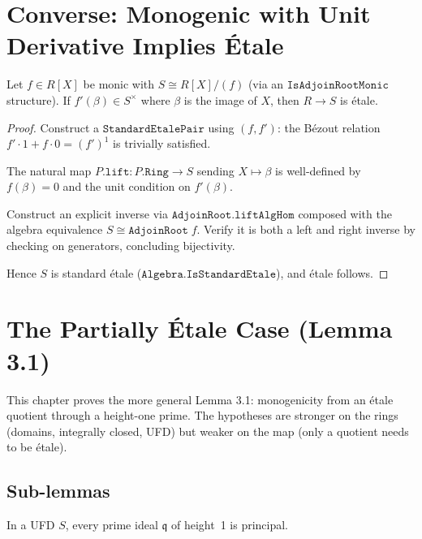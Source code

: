 \chapter{Converse: Monogenic with Unit Derivative Implies \'Etale}
\label{ch:converse}

\begin{theorem}
  \label{thm:algebra_etale}
  \leanok
  Let $f \in R[X]$ be monic with $S \cong R[X]/(f)$
  (via an $\mathtt{IsAdjoinRootMonic}$ structure).
  If $f'(\beta) \in S^\times$ where $\beta$ is the image of $X$,
  then $R \to S$ is étale.
\end{theorem}

\begin{proof}
  \leanok
  Construct a $\mathtt{StandardEtalePair}$ using $(f, f')$:
  the Bézout relation $f' \cdot 1 + f \cdot 0 = (f')^1$ is trivially satisfied.

  The natural map $P.\mathtt{lift} \colon P.\mathtt{Ring} \to S$ sending $X \mapsto \beta$
  is well-defined by $f(\beta) = 0$ and the unit condition on $f'(\beta)$.

  Construct an explicit inverse via $\mathtt{AdjoinRoot.liftAlgHom}$
  composed with the algebra equivalence $S \cong \mathtt{AdjoinRoot}\; f$.
  Verify it is both a left and right inverse by checking on generators,
  concluding bijectivity.

  Hence $S$ is standard étale ($\mathtt{Algebra.IsStandardEtale}$),
  and étale follows.
\end{proof}


\chapter{The Partially \'Etale Case (Lemma 3.1)}
\label{ch:nonetale}

This chapter proves the more general Lemma 3.1: monogenicity from an
étale quotient through a height-one prime. The hypotheses are stronger
on the rings (domains, integrally closed, UFD) but weaker on the map
(only a quotient needs to be étale).

\section{Sub-lemmas}

\begin{lemma}
  \label{lem:height_one_principal}
  \leanok
  In a UFD $S$, every prime ideal $\mathfrak{q}$ of height~1 is principal.
\end{lemma}

